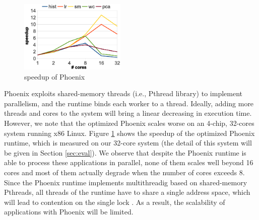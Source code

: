 




\begin{figure}[!h!t]  
	\centering
	\includegraphics[width=0.45\textwidth]{eps/phoenix_speedup.eps}
	\caption{speedup of Phoenix}
	\label{fig:phoenix:speedup}
\end{figure}

Phoenix exploits shared-memory threads (i.e., Pthread library) to implement parallelism, and the runtime binds each worker to a thread.
Ideally, adding more threads and cores to the system will bring a linear decreasing in execution time.
However, we note that the optimized Phoenix \cite{yoo2009phoenix2}  scales worse on an 4-chip, 32-cores system running x86 Linux.
Figure \ref{fig:phoenix:speedup} shows the speedup of the optimized Phoenix runtime, which is measured on our 32-core system (the detail of this system will be given in Section \ref{sec:eval}). 
We observe that despite the Phoenix runtime is able to process these applications in parallel, none of them scales well beyond 16 cores and most of them actually degrade when the number of cores exceeds 8.
Since the Phoenix runtime implements multithreadig based on shared-memory Pthreads, all threads of the runtime have to share a single address space, which will lead to contention on the single lock \cite{Clements2013RadixVM}.
As a result, the scalability of applications with Phoenix will be limited. 
 

